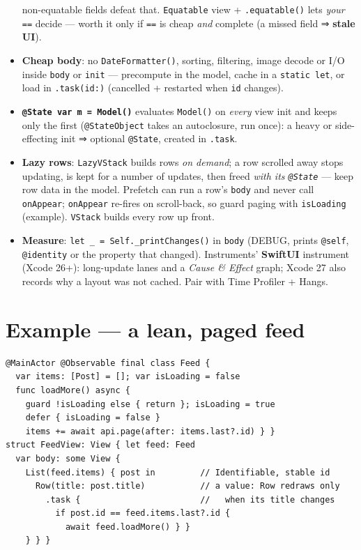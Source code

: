 \documentclass[8pt]{extarticle}
\begin{document}
\begin{multicols}{2}
\begin{itemize}
        non-equatable fields defeat that. \texttt{Equatable} view + \texttt{.equatable()} lets \emph{your}
        \texttt{==} decide — worth it only if \texttt{==} is cheap \emph{and} complete (a missed field ⇒ \textbf{stale UI}).
  \item \textbf{Cheap body}: no \texttt{DateFormatter()}, sorting, filtering, image decode or I/O inside
        \texttt{body} or \texttt{init} — precompute in the model, cache in a \texttt{static let}, or load in
        \texttt{.task(id:)} (cancelled + restarted when \texttt{id} changes).
  \item \textbf{\texttt{@State var m = Model()}} evaluates \texttt{Model()} on \emph{every} view init and keeps
        only the first (\texttt{@StateObject} takes an autoclosure, run once): a heavy or side-effecting
        init ⇒ optional \texttt{@State}, created in \texttt{.task}.
  \item \textbf{Lazy rows}: \texttt{LazyVStack} builds rows \emph{on demand}; a row scrolled away stops updating,
        is kept for a number of updates, then freed \emph{with its \texttt{@State}} — keep row data in the model.
        Prefetch can run a row's \texttt{body} and never call \texttt{onAppear}; \texttt{onAppear} re-fires on
        scroll-back, so guard paging with \texttt{isLoading} (example). \texttt{VStack} builds every row up front.
  \item \textbf{Measure}: \texttt{let \_ = Self.\_printChanges()} in \texttt{body} (DEBUG, prints
        \texttt{@self}, \texttt{@identity} or the property that changed). Instruments' \textbf{SwiftUI}
        instrument (Xcode 26+): long-update lanes and a \emph{Cause \& Effect} graph; Xcode 27 also records
        why a layout was not cached. Pair with Time Profiler + Hangs.
\end{itemize}

\section{Example — a lean, paged feed}
\begin{lstlisting}[language=SwiftSheet]
@MainActor @Observable final class Feed {
  var items: [Post] = []; var isLoading = false
  func loadMore() async {
    guard !isLoading else { return }; isLoading = true
    defer { isLoading = false }
    items += await api.page(after: items.last?.id) } }
struct FeedView: View { let feed: Feed
  var body: some View {
    List(feed.items) { post in         // Identifiable, stable id
      Row(title: post.title)           // a value: Row redraws only
        .task {                        //   when its title changes
          if post.id == feed.items.last?.id {
            await feed.loadMore() } }
    } } }
\end{lstlisting}


\end{multicols}
\end{document}
